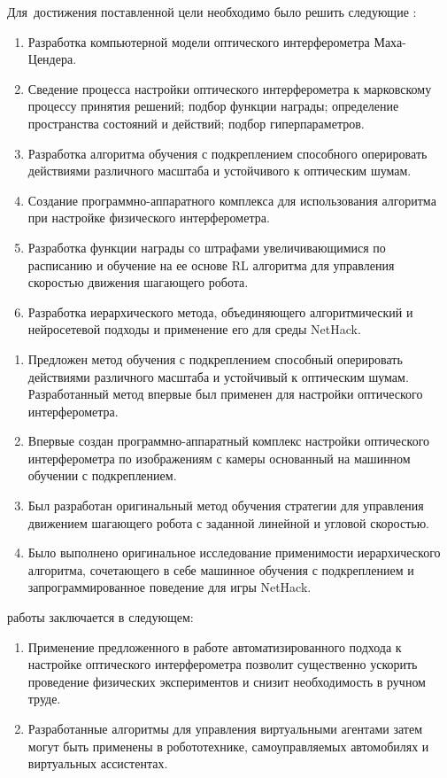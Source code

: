 Для~достижения поставленной цели необходимо было решить следующие {\tasks}:
\begin{enumerate}[beginpenalty=10000] %
  \item Разработка компьютерной модели оптического интерферометра Маха-Цендера.
  \item Сведение процесса настройки оптического интерферометра к марковскому процессу принятия решений; подбор функции награды; определение пространства состояний и действий; подбор гиперпараметров.
  \item Разработка алгоритма обучения с подкреплением способного оперировать действиями различного масштаба и устойчивого к оптическим шумам.
  \item Создание программно-аппаратного комплекса для использования алгоритма при настройке физического интерферометра.
  \item Разработка функции награды со штрафами увеличивающимися по расписанию и обучение на ее основе RL алгоритма для управления скоростью движения шагающего робота.
  \item Разработка иерархического метода, объединяющего алгоритмический и нейросетевой подходы и применение его для среды NetHack.
\end{enumerate}


{\novelty}
\begin{enumerate}[beginpenalty=10000] %
  \item Предложен метод обучения с подкреплением способный оперировать действиями различного масштаба и устойчивый к оптическим шумам. Разработанный метод впервые был применен для настройки оптического интерферометра. 
  \item Впервые создан программно-аппаратный комплекс настройки оптического интерферометра по изображениям с камеры основанный на машинном обучении с подкреплением.
  \item Был разработан оригинальный метод обучения стратегии для управления движением шагающего робота с заданной линейной и угловой скоростью.
  \item Было выполнено оригинальное исследование применимости иерархического алгоритма, сочетающего в себе машинное обучения с подкреплением и запрограммированное поведение для игры NetHack.
\end{enumerate}

{\influence} работы заключается в следующем:
\begin{enumerate}[beginpenalty=10000] %
  \item Применение предложенного в работе автоматизированного подхода к настройке оптического интерферометра позволит существенно ускорить проведение физических экспериментов и снизит необходимость в ручном труде. 
  \item Разработанные алгоритмы для управления виртуальными агентами затем могут быть применены в робототехнике, самоуправляемых автомобилях и виртуальных ассистентах. 
\end{enumerate}

